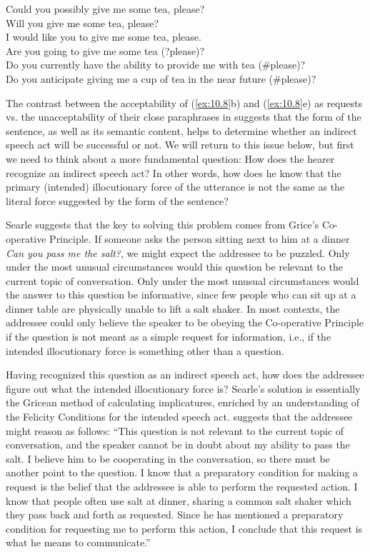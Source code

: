 \ea \label{ex:10.10}
\ea Could you possibly give me some tea, please?\\
\ex Will you give me some tea, please?\\
\ex I would like you to give me some tea, please.\\
\ex Are you going to give me some tea (?please)?\\
\ex Do you currently have the ability to provide me with tea (\#please)?\\
\ex Do you anticipate giving me a cup of tea in the near future (\#please)?
\z


The contrast between the acceptability of (\ref{ex:10.8}b) and (\ref{ex:10.8}e) as requests vs. the unacceptability of their close paraphrases in  suggests that the form of the sentence, as well as its semantic content, helps to determine whether an indirect speech act will be successful or not. We will return to this issue below, but first we need to think about a more fundamental question: How does the hearer recognize an indirect speech act? In other words, how does he know that the primary (intended) illocutionary force of the utterance is not the same as the literal force suggested by the form of the sentence?



Searle suggests that the key to solving this problem comes from Grice’s Co-operative Principle. If someone asks the person sitting next to him at a dinner \textit{Can you pass me the salt?}, we might expect the addressee to be puzzled. Only under the most unusual circumstances would this question be relevant to the current topic of conversation. Only under the most unusual circumstances would the answer to this question be informative, since few people who can sit up at a dinner table are physically unable to lift a salt shaker. In most contexts, the addressee could only believe the speaker to be obeying the Co-operative Principle if the question is not meant as a simple request for information, i.e., if the intended illocutionary force is something other than a question.



Having recognized this question as an indirect speech act, how does the addressee figure out what the intended illocutionary force is? Searle’s solution is essentially the Gricean method of calculating implicatures, enriched by an understanding of the Felicity Conditions for the intended speech act. \citet{Searle1975} suggests that the addressee might reason as follows: “This question is not relevant to the current topic of conversation, and the speaker cannot be in doubt about my ability to pass the salt. I believe him to be cooperating in the conversation, so there must be another point to the question. I know that a preparatory condition for making a request is the belief that the addressee is able to perform the requested action. I know that people often use salt at dinner, sharing a common salt shaker which they pass back and forth as requested. Since he has mentioned a preparatory condition for requesting me to perform this action, I conclude that this request is what he means to communicate.”



